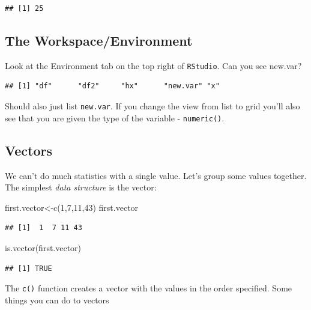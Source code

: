 \documentclass[
]{gitbook}
\newenvironment{Shaded}{\begin{snugshade}}{\end{snugshade}}
\newcommand{\DecValTok}[1]{\textcolor[rgb]{0.00,0.00,0.81}{#1}}
\newcommand{\FunctionTok}[1]{\textcolor[rgb]{0.00,0.00,0.00}{#1}}
\newcommand{\NormalTok}[1]{#1}
\newcommand{\OtherTok}[1]{\textcolor[rgb]{0.56,0.35,0.01}{#1}}
\begin{document}
\begin{verbatim}
## [1] 25
\end{verbatim}

\hypertarget{the-workspaceenvironment}{%
\subsection{The Workspace/Environment}\label{the-workspaceenvironment}}

Look at the Environment tab on the top right of \texttt{RStudio}. Can you see new.var?

\begin{verbatim}
## [1] "df"      "df2"     "hx"      "new.var" "x"
\end{verbatim}

Should also just list \texttt{new.var}. If you change the view from list to grid you'll also see that you are given the type of the variable - \texttt{numeric()}.

\hypertarget{vectors}{%
\subsection{Vectors}\label{vectors}}

We can't do much statistics with a single value. Let's group some values together. The simplest \emph{data structure} is the vector:

\begin{Shaded}
\begin{Highlighting}[]
\NormalTok{first.vector}\OtherTok{\textless{}{-}}\FunctionTok{c}\NormalTok{(}\DecValTok{1}\NormalTok{,}\DecValTok{7}\NormalTok{,}\DecValTok{11}\NormalTok{,}\DecValTok{43}\NormalTok{)}
\NormalTok{first.vector}
\end{Highlighting}
\end{Shaded}

\begin{verbatim}
## [1]  1  7 11 43
\end{verbatim}

\begin{Shaded}
\begin{Highlighting}[]
\FunctionTok{is.vector}\NormalTok{(first.vector)}
\end{Highlighting}
\end{Shaded}

\begin{verbatim}
## [1] TRUE
\end{verbatim}

The \texttt{c()} function creates a vector with the values in the order specified. Some things you can do to vectors
\end{document}
